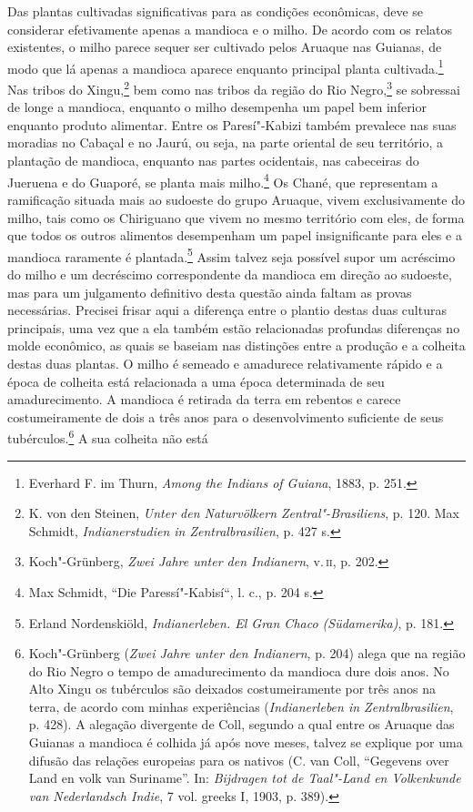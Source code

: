 Das plantas cultivadas significativas para as condições econômicas, deve
se considerar efetivamente apenas a mandioca e o milho. De acordo com
os relatos existentes, o milho parece sequer ser cultivado pelos Aruaque
nas Guianas, de modo que lá apenas a mandioca aparece enquanto principal
planta cultivada.\footnote{Everhard F. im Thurn, \emph{Among the Indians
  of Guiana}, 1883, p. 251.} Nas tribos do Xingu,\footnote{K. von den
  Steinen, \emph{Unter den Naturvölkern Zentral"-Brasiliens}, p. 120. Max
  Schmidt, \emph{Indianerstudien in Zentralbrasilien}, p. 427 s.} bem
como nas tribos da região do Rio Negro,\footnote{Koch"-Grünberg,
  \emph{Zwei Jahre unter den Indianern}, v.\,\textsc{ii}, p. 202.} se sobressai
de longe a mandioca, enquanto o milho desempenha um papel bem inferior
enquanto produto alimentar. Entre os Paresí"-Kabizi também prevalece nas
suas moradias no Cabaçal e no Jaurú, ou seja, na parte oriental de seu
território, a plantação de mandioca, enquanto nas partes ocidentais, nas
cabeceiras do Jueruena e do Guaporé, se planta mais milho.\footnote{Max
  Schmidt, ``Die Paressí"-Kabisí``, l. c., p. 204 s.} Os Chané, que
representam a ramificação situada mais ao sudoeste do grupo Aruaque,
vivem exclusivamente do milho, tais como os Chiriguano que vivem no
mesmo território com eles, de forma que todos os outros alimentos
desempenham um papel insignificante para eles e a mandioca raramente é
plantada.\footnote{Erland Nordenskiöld, \emph{Indianerleben. El Gran
  Chaco (Südamerika)}, p. 181.} Assim talvez seja possível supor um
acréscimo do milho e um decréscimo correspondente da mandioca em direção
ao sudoeste, mas para um julgamento definitivo desta questão ainda
faltam as provas necessárias. Precisei frisar aqui a diferença entre o
plantio destas duas culturas principais, uma vez que a ela também estão
relacionadas profundas diferenças no molde econômico, as quais se
baseiam nas distinções entre a produção e a colheita destas duas
plantas. O milho é semeado e amadurece relativamente rápido e a época de
colheita está relacionada a uma época determinada de seu amadurecimento.
A mandioca é retirada da terra em rebentos e carece costumeiramente de
dois a três anos para o desenvolvimento suficiente de seus
tubérculos.\footnote{Koch"-Grünberg (\emph{Zwei Jahre unter den
  Indianern}, p. 204) alega que na região do Rio Negro o tempo de
  amadurecimento da mandioca dure dois anos. No Alto Xingu os tubérculos
  são deixados costumeiramente por três anos na terra, de acordo com
  minhas experiências (\emph{Indianerleben in Zentralbrasilien}, p.
  428). A alegação divergente de Coll, segundo a qual entre os Aruaque
  das Guianas a mandioca é colhida já após nove meses, talvez se
  explique por uma difusão das relações europeias para os nativos (C.
  van Coll, ``Gegevens over Land en volk van Suriname''. In:
  \emph{Bijdragen tot de Taal"-Land en Volkenkunde van Nederlandsch
  Indie}, 7 vol. greeks I, 1903, p. 389).} A sua colheita não está
